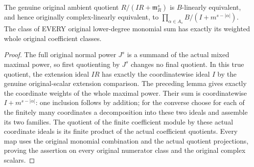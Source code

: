 \begin{theorem}
\label{hir:actual-product-whole-ambient-jet-weighted-coefficient-quotient}
\leanok
The genuine original ambient quotient
$R/(IR+\mathfrak m_R^s)$ is $B$-linearly equivalent, and hence originally
complex-linearly equivalent, to
$\prod_{\alpha\in A_s}B/(I+m^{s-|\alpha|})$.
The class of EVERY original lower-degree monomial sum has exactly its
weighted whole original coefficient classes.
\end{theorem}
\begin{proof}
The full original normal power $J^s$ is a summand of the actual mixed
maximal power, so first quotienting by $J^s$ changes no final quotient.
In this true quotient, the extension ideal $IR$ has exactly the
coordinatewise ideal $I$ by the genuine original-scalar extension
comparison. The preceding lemma gives exactly the coordinate weights
of the whole maximal power. Their sum is coordinatewise $I+m^{s-|\alpha|}$:
one inclusion follows by addition; for the converse choose for each of
the finitely many coordinates a decomposition into these two ideals
and assemble its two families. The quotient of the finite coefficient
module by these actual coordinate ideals is its finite product of the
actual coefficient quotients. Every map uses the original monomial
combination and the actual quotient projections, proving the assertion
on every original numerator class and the original complex scalars.
\end{proof}

